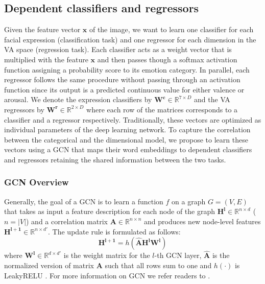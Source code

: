 \documentclass[a4paper, 10pt, conference]{ieeeconf}      \usepackage{FG2021}
\begin{document}
\subsection{Dependent classifiers and regressors}

Given the feature vector $\mathbf{x}$ of the image, we want to learn one classifier for each facial expression (classification task) and one regressor for each dimension in the VA space (regression task). Each classifier acts as a weight vector that is multiplied with the feature $\mathbf{x}$ and then passes though a softmax activation function assigning a probability score to its emotion category. In parallel, each regressor follows the same procedure without passing through an activation function since its output is a  predicted continuous value for either valence or arousal. We denote the expression classifiers by $\mathbf{W^{c}} \in \mathbb{R}^{7 \times D}$ and the VA regressors by $\mathbf{W^{r}} \in \mathbb{R}^{2 \times D}$ where each row of the matrices corresponds to a classifier and a regressor respectively. Traditionally, these vectors are optimized as individual parameters of the deep learning network. To capture the correlation between the categorical and the dimensional model, we propose to learn these vectors using a GCN that maps their word embeddings to dependent classifiers and regressors retaining the shared information between the two tasks.

\subsubsection{GCN Overview}

Generally, the goal of a GCN is to learn a function $f$ on a graph $G=(V, E)$ that takes as input a feature description for each node of the graph $\mathbf{H^l} \in \mathbb{R}^{n \times d}$ ($n = |V|$) and a correlation matrix $\mathbf{A} \in \mathbb{R}^{n \times n}$ and produces new node-level features $\mathbf{H^{l+1}} \in \mathbb{R}^{n \times d'}$. The update rule is formulated as follows:
\begin{equation}
    \mathbf{H^{l+1}} = h(\mathbf{\hat{A}} \mathbf{H^l} \mathbf{W^l})
    \label{eqn:gcn_update}
\end{equation}
where $\mathbf{W^l} \in \mathbb{R}^{d \times d'}$ is the weight matrix for the $l$-th GCN layer, $\mathbf{\hat{A}}$ is the normalized version of matrix $\mathbf{A}$ such that all rows sum to one and $h(\cdot)$ is LeakyRELU \cite{maas2013rectifier}. For more information on GCN we refer readers to \cite{kipf2016semi}.
\end{document}

